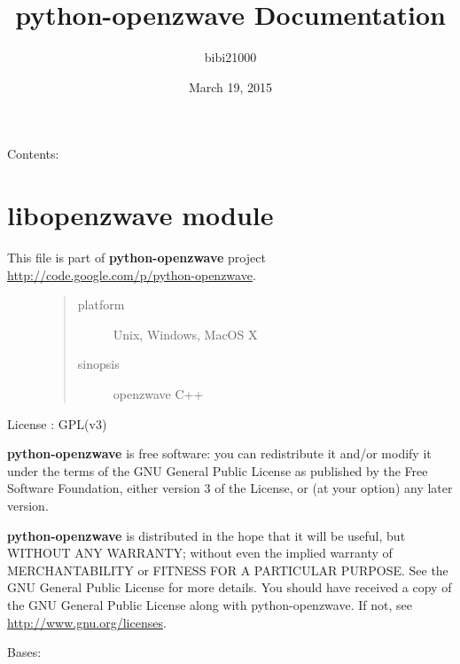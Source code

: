 \documentclass[letterpaper,10pt,english]{sphinxmanual}
\title{python-openzwave Documentation}
\date{March 19, 2015}
\author{bibi21000}
\begin{document}
\maketitle
\tableofcontents
{}\label{index::doc}


Contents:


\chapter{libopenzwave module}
\label{libopenzwave:libopenzwave-module}\label{libopenzwave::doc}\label{libopenzwave:welcome-to-python-openzwave-s-documentation}\label{libopenzwave:module-libopenzwave}\label{libopenzwave:module-libopenzwave}\begin{description}
\item[{This file is part of \textbf{python-openzwave} project \href{http://code.google.com/p/python-openzwave}{http://code.google.com/p/python-openzwave}.}] \leavevmode\begin{quote}\begin{description}
\item[{platform}] \leavevmode
Unix, Windows, MacOS X

\item[{sinopsis}] \leavevmode
openzwave C++

\end{description}\end{quote}

\end{description}

License : GPL(v3)

\textbf{python-openzwave} is free software: you can redistribute it and/or modify
it under the terms of the GNU General Public License as published by
the Free Software Foundation, either version 3 of the License, or
(at your option) any later version.

\textbf{python-openzwave} is distributed in the hope that it will be useful,
but WITHOUT ANY WARRANTY; without even the implied warranty of
MERCHANTABILITY or FITNESS FOR A PARTICULAR PURPOSE. See the
GNU General Public License for more details.
You should have received a copy of the GNU General Public License
along with python-openzwave. If not, see \href{http://www.gnu.org/licenses}{http://www.gnu.org/licenses}.

\begin{fulllineitems}
\label{libopenzwave:libopenzwave.EnumWithDoc}
Bases: 

\begin{fulllineitems}
\label{libopenzwave:libopenzwave.EnumWithDoc.setDoc}
\end{fulllineitems}


\end{fulllineitems}
\end{document}
